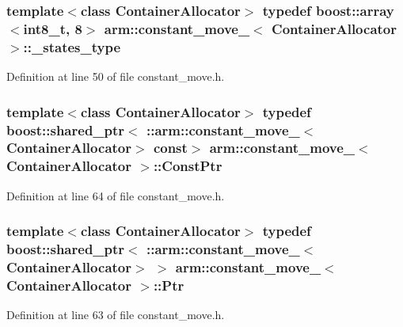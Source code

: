 \subsubsection[{\-\_\-states\-\_\-type}]{\setlength{\rightskip}{0pt plus 5cm}template$<$class \-Container\-Allocator$>$ typedef boost\-::array$<$int8\-\_\-t, 8$>$ {\bf arm\-::constant\-\_\-move\-\_\-}$<$ \-Container\-Allocator $>$\-::{\bf \-\_\-states\-\_\-type}}\label{structarm_1_1constant__move___a6a7273c660069786239f1bc3c2f6f9a3}


\-Definition at line 50 of file constant\-\_\-move.\-h.

\subsubsection[{\-Const\-Ptr}]{\setlength{\rightskip}{0pt plus 5cm}template$<$class \-Container\-Allocator$>$ typedef boost\-::shared\-\_\-ptr$<$ \-::{\bf arm\-::constant\-\_\-move\-\_\-}$<$\-Container\-Allocator$>$ const$>$ {\bf arm\-::constant\-\_\-move\-\_\-}$<$ \-Container\-Allocator $>$\-::{\bf \-Const\-Ptr}}\label{structarm_1_1constant__move___a1159b3cf465f7e977508fa5c7b48fe95}


\-Definition at line 64 of file constant\-\_\-move.\-h.

\subsubsection[{\-Ptr}]{\setlength{\rightskip}{0pt plus 5cm}template$<$class \-Container\-Allocator$>$ typedef boost\-::shared\-\_\-ptr$<$ \-::{\bf arm\-::constant\-\_\-move\-\_\-}$<$\-Container\-Allocator$>$ $>$ {\bf arm\-::constant\-\_\-move\-\_\-}$<$ \-Container\-Allocator $>$\-::{\bf \-Ptr}}\label{structarm_1_1constant__move___aabffd1d2fbbc232df32cd23d623e79d6}


\-Definition at line 63 of file constant\-\_\-move.\-h.

